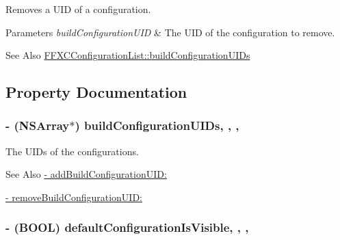 Removes a U\-I\-D of a configuration. 
\begin{DoxyParams}{Parameters}
{\em build\-Configuration\-U\-I\-D} & The U\-I\-D of the configuration to remove. \\
\hline
\end{DoxyParams}
\begin{DoxySeeAlso}{See Also}
\hyperlink{interface_f_f_x_c_configuration_list_ae4fc25030483b80f27f94964838dff80}{F\-F\-X\-C\-Configuration\-List\-::build\-Configuration\-U\-I\-Ds} 
\end{DoxySeeAlso}


\subsection{Property Documentation}
\hypertarget{interface_f_f_x_c_configuration_list_ae4fc25030483b80f27f94964838dff80}{
\subsubsection[{build\-Configuration\-U\-I\-Ds}]{\setlength{\rightskip}{0pt plus 5cm}-\/ (N\-S\-Array$\ast$) build\-Configuration\-U\-I\-Ds\hspace{0.3cm}{\ttfamily [read]}, {\ttfamily [write]}, {\ttfamily [nonatomic]}, {\ttfamily [strong]}}}\label{interface_f_f_x_c_configuration_list_ae4fc25030483b80f27f94964838dff80}
The U\-I\-Ds of the configurations. \begin{DoxySeeAlso}{See Also}
\hyperlink{interface_f_f_x_c_configuration_list_a5bdd1646f874e219f9d35b7307e6be44}{-\/ add\-Build\-Configuration\-U\-I\-D\-:} 

\hyperlink{interface_f_f_x_c_configuration_list_adb9a5da1f8159ad4251b07f035fe1c23}{-\/ remove\-Build\-Configuration\-U\-I\-D\-:} 
\end{DoxySeeAlso}
\hypertarget{interface_f_f_x_c_configuration_list_acbd85703d18dd26a7ee2ece4a8845886}{
\subsubsection[{default\-Configuration\-Is\-Visible}]{\setlength{\rightskip}{0pt plus 5cm}-\/ (B\-O\-O\-L) default\-Configuration\-Is\-Visible\hspace{0.3cm}{\ttfamily [read]}, {\ttfamily [write]}, {\ttfamily [nonatomic]}, {\ttfamily [assign]}}}\label{interface_f_f_x_c_configuration_list_acbd85703d18dd26a7ee2ece4a8845886}
